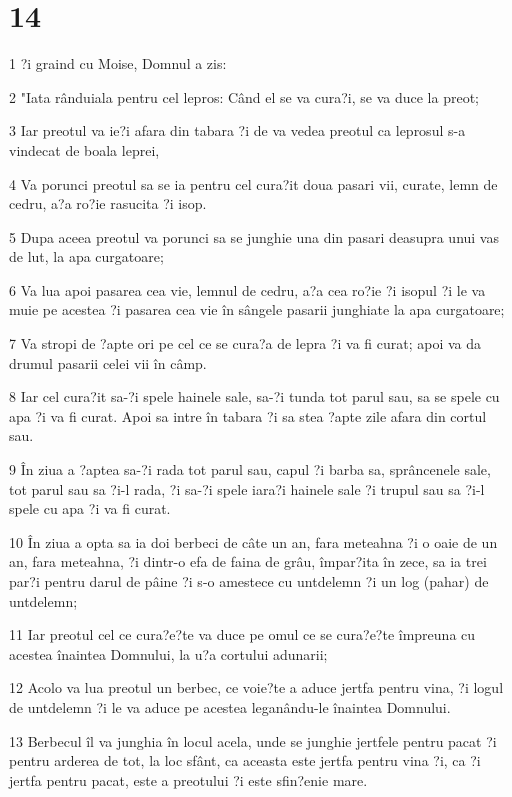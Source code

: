\chapter{14}

\par 1 ?i graind cu Moise, Domnul a zis:
\par 2 "Iata rânduiala pentru cel lepros: Când el se va cura?i, se va duce la preot;
\par 3 Iar preotul va ie?i afara din tabara ?i de va vedea preotul ca leprosul s-a vindecat de boala leprei,
\par 4 Va porunci preotul sa se ia pentru cel cura?it doua pasari vii, curate, lemn de cedru, a?a ro?ie rasucita ?i isop.
\par 5 Dupa aceea preotul va porunci sa se junghie una din pasari deasupra unui vas de lut, la apa curgatoare;
\par 6 Va lua apoi pasarea cea vie, lemnul de cedru, a?a cea ro?ie ?i isopul ?i le va muie pe acestea ?i pasarea cea vie în sângele pasarii junghiate la apa curgatoare;
\par 7 Va stropi de ?apte ori pe cel ce se cura?a de lepra ?i va fi curat; apoi va da drumul pasarii celei vii în câmp.
\par 8 Iar cel cura?it sa-?i spele hainele sale, sa-?i tunda tot parul sau, sa se spele cu apa ?i va fi curat. Apoi sa intre în tabara ?i sa stea ?apte zile afara din cortul sau.
\par 9 În ziua a ?aptea sa-?i rada tot parul sau, capul ?i barba sa, sprâncenele sale, tot parul sau sa ?i-l rada, ?i sa-?i spele iara?i hainele sale ?i trupul sau sa ?i-l spele cu apa ?i va fi curat.
\par 10 În ziua a opta sa ia doi berbeci de câte un an, fara meteahna ?i o oaie de un an, fara meteahna, ?i dintr-o efa de faina de grâu, împar?ita în zece, sa ia trei par?i pentru darul de pâine ?i s-o amestece cu untdelemn ?i un log (pahar) de untdelemn;
\par 11 Iar preotul cel ce cura?e?te va duce pe omul ce se cura?e?te împreuna cu acestea înaintea Domnului, la u?a cortului adunarii;
\par 12 Acolo va lua preotul un berbec, ce voie?te a aduce jertfa pentru vina, ?i logul de untdelemn ?i le va aduce pe acestea leganându-le înaintea Domnului.
\par 13 Berbecul îl va junghia în locul acela, unde se junghie jertfele pentru pacat ?i pentru arderea de tot, la loc sfânt, ca aceasta este jertfa pentru vina ?i, ca ?i jertfa pentru pacat, este a preotului ?i este sfin?enie mare.
